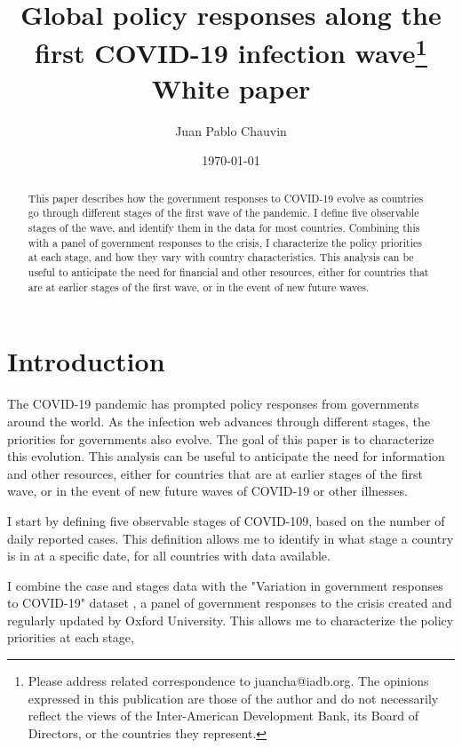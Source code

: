 \documentclass[12pt,english]{article}
\title{{\Large{}Global policy responses along the first COVID-19 infection wave\footnote{Please address related correspondence to juancha@iadb.org. The opinions expressed in this publication are those of the author and do not necessarily reflect the views of the Inter-American Development Bank, its Board of Directors, or the countries they represent.} \\ White paper}}
\author{Juan Pablo Chauvin}
\affil{Research Department, Inter-American Development Bank}
\begin{document}
\begin{titlepage}

\date{\today\\
\vspace{-10bp}
}

\maketitle
\begin{abstract}
\noindent 


This paper describes how the government responses to  COVID-19 evolve as countries go through different stages of the first wave of the pandemic.  I define five observable stages of the wave, and identify them in the data for most countries. Combining this with a panel of government responses to the crisis, I characterize the policy priorities at each stage, and how they vary with country characteristics. This analysis can be useful to anticipate the need for financial and other resources, either for countries that are at earlier stages of the first wave, or in the event of new future waves. 


  
\bigskip
\end{abstract}
\setcounter{page}{0}
\thispagestyle{empty}
\end{titlepage}
\pagebreak \newpage


\onehalfspace


\section{Introduction}

The COVID-19 pandemic has prompted policy responses from governments around the world.  As the infection web advances through different stages, the priorities for governments also evolve.  The goal of this paper is to characterize this evolution.  This analysis can be useful to anticipate the need for information and other resources, either for countries that are at earlier stages of the first wave, or in the event of new future waves of COVID-19 or other illnesses. 

I start by defining five observable stages of COVID-109, based on the number of daily reported cases. This definition allows me to identify in what stage a country is in at a specific date, for all countries with data available.  

I combine the case and stages data with the "Variation in government responses to COVID-19" dataset  \citep{Roser2020}, a panel of government responses to the crisis created and regularly updated by Oxford University.  This allows me to characterize the policy priorities at each stage, 
\end{document}
